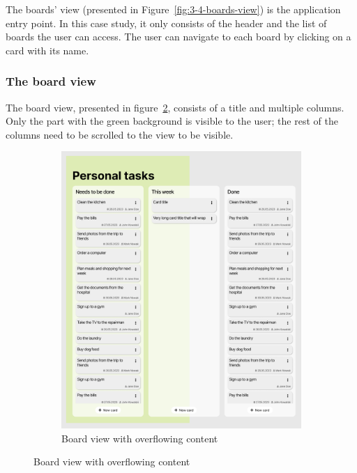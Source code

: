 The boards' view (presented in Figure~\ref{fig:3-4-boards-view}) is the application entry point.
In this case study, it only consists of the header and the list of boards the user can access.
The user can navigate to each board by clicking on a card with its name.

\subsubsection{The board view}
The board view, presented in figure~\ref{fig:3-4-board-view-expanded}, consists of a title and multiple columns.
Only the part with the green background is visible to the user;
the rest of the columns need to be scrolled to the view to be visible.

\begin{figure}
    \centering
    \begin{subfigure}[m]{0.6\textwidth}
        \centering
        \includegraphics[height=0.4\textheight]{./3-research-methodology/board-view}
        \caption{Board view with overflowing content}
        \label{fig:3-4-board-view-expanded}
    \end{subfigure}
    \hfill

\end{figure}
